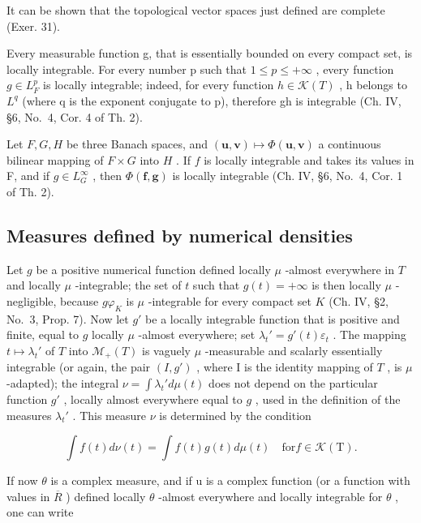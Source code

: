 It can be shown that the topological vector spaces just defined are complete (Exer. 31).

Every measurable function g, that is essentially bounded on every compact set, is locally integrable. For every number p such that \(1 \leqslant p \leqslant +\infty\) , every function \(g \in L_{F}^{p}\) is locally integrable; indeed, for every function \(h \in \mathcal{K}(T)\) , h belongs to \(L^{q}\) (where q is the exponent conjugate to p), therefore gh is integrable (Ch. IV, §6, No.~4, Cor. 4 of Th. 2).

Let \(F, G, H\) be three Banach spaces, and \((\mathbf{u}, \mathbf{v}) \mapsto \Phi(\mathbf{u}, \mathbf{v})\) a continuous bilinear mapping of \(F \times G\) into \(H\) . If \(f\) is locally integrable and takes its values in F, and if \(g \in L_{G}^{\infty}\) , then \(\Phi(\mathbf{f}, \mathbf{g})\) is locally integrable (Ch. IV, §6, No.~4, Cor. 1 of Th. 2).

\subsection{Measures defined by numerical densities}

Let \(g\) be a positive numerical function defined locally \(\mu\) -almost everywhere in \(T\) and locally \(\mu\) -integrable; the set of \(t\) such that \(g(t) = +\infty\) is then locally \(\mu\) -negligible, because \(g\varphi_{K}\) is \(\mu\) -integrable for every compact set \(K\) (Ch. IV, §2, No.~3, Prop. 7). Now let \(g'\) be a locally integrable function that is positive and finite, equal to \(g\) locally \(\mu\) -almost everywhere; set \(\lambda_t' = g'(t)\varepsilon_t\) . The mapping \(t \mapsto \lambda_t'\) of \(T\) into \(\mathcal{M}_+(T)\) is vaguely \(\mu\) -measurable and scalarly essentially integrable (or again, the pair \((I,g')\) , where I is the identity mapping of \(T\) , is \(\mu\) -adapted); the integral \(\nu = \int \lambda_t' d\mu(t)\) does not depend on the particular function \(g'\) , locally almost everywhere equal to \(g\) , used in the definition of the measures \(\lambda_t'\) . This measure \(\nu\) is determined by the condition

\[
\int f (t) d \nu (t) = \int f (t) g (t) d \mu (t) \quad \mathrm{for} f \in \mathcal {K} (\mathrm{T}).\tag{1}
\]

If now \(\theta\) is a complex measure, and if u is a complex function (or a function with values in \(\overline{R}\) ) defined locally \(\theta\) -almost everywhere and locally integrable for \(\theta\) , one can write


